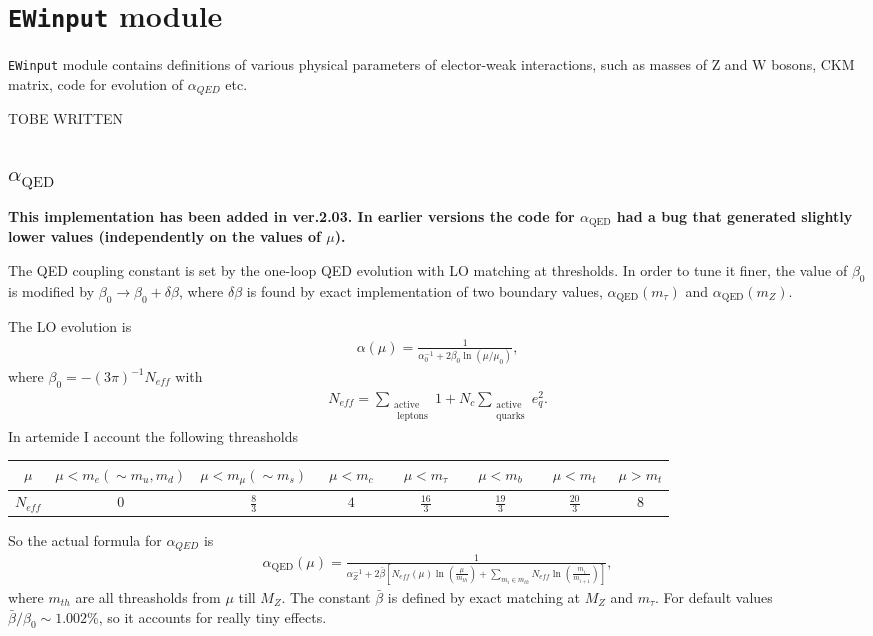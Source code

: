 \documentclass[prd,nofootinbib,eqsecnum,final]{revtex4}
\renewcommand{\(}{\left(}
\renewcommand{\)}{\right)}
\renewcommand{\[}{\left[}
\renewcommand{\]}{\right]}
\newcommand{\red}[1]{{\color[rgb]{1,0,0} #1}}
\begin{document}
\newpage
\section{\texttt{EWinput} module}
\label{EWinput}

\texttt{EWinput} module contains definitions of various physical parameters of elector-weak interactions, such as masses of Z and W bosons, CKM matrix, code for evolution of $\alpha_{QED}$ etc.

\red{TOBE WRITTEN}

\subsection{$\alpha_{\text{QED}}$}

\textbf{This implementation has been added in ver.2.03. In earlier versions the code for $\alpha_{\text{QED}}$ had a bug that generated slightly lower values (independently on the values of $\mu$).}

The QED coupling constant is set by the one-loop QED evolution with LO matching at thresholds. In order to tune it finer, the value of $\beta_0$ is modified by $\beta_0\to \beta_0+\delta \beta$, where $\delta \beta$ is found by exact implementation of two boundary values, $\alpha_{\text{QED}}(m_\tau)$ and $\alpha_{\text{QED}}(m_Z)$. 

The LO evolution is
\begin{eqnarray}
\alpha(\mu)=\frac{1}{\alpha_0^{-1}+2\beta_0 \ln(\mu/\mu_0)},
\end{eqnarray}
where $\beta_0=-(3\pi)^{-1}N_{eff}$ with 
\begin{eqnarray}
N_{eff}=\sum_{\substack{\text{active}\\\text{ leptons}}}1+N_c\sum_{\substack{\text{active}\\\text{quarks}}}e_q^2.
\end{eqnarray}
In artemide I account the following threasholds
\begin{center}
\begin{tabular}{c||c|c|c|c|c|c|c|}
$\mu$   & $\mu<m_e(\sim m_u,m_d)$ & $\mu<m_\mu(\sim m_s)$ & ~$\mu<m_c$~ & ~$\mu<m_\tau$~ & ~$\mu<m_b$~ & ~$\mu<m_t$~ & $\mu>m_t$
\\\hline
$N_{eff}$& 0 & $\frac{8}{3}$ & $4$ & $\frac{16}{3}$ & $\frac{19}{3}$ & $\frac{20}{3}$ & $8$ 
\end{tabular}
\end{center}
So the actual formula for $\alpha_{QED}$ is
\begin{eqnarray}
\alpha_{\text{QED}}(\mu)=\frac{1}{\alpha_Z^{-1}+2\bar \beta\[N_{eff}(\mu)\ln\(\frac{\mu}{m_{th}}\)+\sum_{m_i\in m_{th}} N_{eff}\ln\(\frac{m_{i}}{m_{i+1}}\)\]},
\end{eqnarray}
where $m_{th}$ are all threasholds from $\mu$ till $M_Z$. The constant $\bar \beta$ is defined by exact matching at $M_Z$ and $m_\tau$. For default values $\bar\beta/\beta_0\sim 1.002\%$, so it accounts for really tiny effects.
\end{document}
